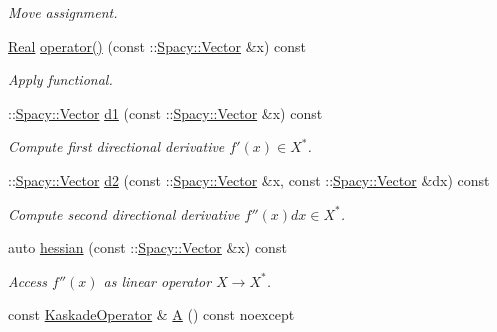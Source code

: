 \begin{DoxyCompactItemize}
\begin{DoxyCompactList}\small\item\em Move assignment. \end{DoxyCompactList}\item 
\hyperlink{classSpacy_1_1Real}{Real} \hyperlink{classSpacy_1_1Kaskade_1_1C2Functional_a74b955be1cc2cb7de4e66b434428fd89}{operator()} (const \+::\hyperlink{classSpacy_1_1Vector}{Spacy\+::\+Vector} \&x) const 
\begin{DoxyCompactList}\small\item\em Apply functional. \end{DoxyCompactList}\item 
\+::\hyperlink{classSpacy_1_1Vector}{Spacy\+::\+Vector} \hyperlink{classSpacy_1_1Kaskade_1_1C2Functional_a69d3260b5313bd495e8f5871b15738db}{d1} (const \+::\hyperlink{classSpacy_1_1Vector}{Spacy\+::\+Vector} \&x) const 
\begin{DoxyCompactList}\small\item\em Compute first directional derivative $f'(x) \in X^* $. \end{DoxyCompactList}\item 
\+::\hyperlink{classSpacy_1_1Vector}{Spacy\+::\+Vector} \hyperlink{classSpacy_1_1Kaskade_1_1C2Functional_a7bd6c110c1f954a92f43f6035787a9f0}{d2} (const \+::\hyperlink{classSpacy_1_1Vector}{Spacy\+::\+Vector} \&x, const \+::\hyperlink{classSpacy_1_1Vector}{Spacy\+::\+Vector} \&dx) const 
\begin{DoxyCompactList}\small\item\em Compute second directional derivative $f''(x)dx\in X^* $. \end{DoxyCompactList}\item 
auto \hyperlink{classSpacy_1_1Kaskade_1_1C2Functional_a73e0b9a2499e89bf85eddf1aa74fe9ba}{hessian} (const \+::\hyperlink{classSpacy_1_1Vector}{Spacy\+::\+Vector} \&x) const 
\begin{DoxyCompactList}\small\item\em Access $f''(x)$ as linear operator $X\rightarrow X^*$. \end{DoxyCompactList}\item 
\hypertarget{classSpacy_1_1Kaskade_1_1C2Functional_ab45aa1c81e4698b642a5381a9b6be14b}{}const \hyperlink{classSpacy_1_1Kaskade_1_1C2Functional_af530f936729e854d2fd1401526149ba1}{Kaskade\+Operator} \& \hyperlink{classSpacy_1_1Kaskade_1_1C2Functional_ab45aa1c81e4698b642a5381a9b6be14b}{A} () const noexcept\label{classSpacy_1_1Kaskade_1_1C2Functional_ab45aa1c81e4698b642a5381a9b6be14b}


\end{DoxyCompactItemize}
